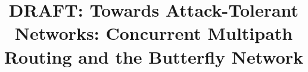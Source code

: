 \documentclass{sig-alternate-05-2015}
\begin{document}


\doi{}

\isbn{}


%

\title{DRAFT: Towards Attack-Tolerant Networks: Concurrent Multipath Routing and the Butterfly Network}
%
%
%
%
%
\end{document}
